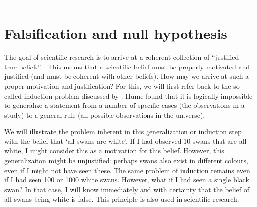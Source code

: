 \documentclass[
]{book}
\begin{document}
\begin{center}\rule{0.5\linewidth}{0.5pt}\end{center}

\hypertarget{sec:falsification}{%
\section{Falsification and null hypothesis}\label{sec:falsification}}

The goal of scientific research is to arrive at a coherent collection of ``justified true beliefs'' \citep{Mort03}. This means that a scientific belief must be properly motivated and justified (and must be coherent with other beliefs). How may we arrive at such a proper motivation and justification? For this, we will first refer back to the so-called induction problem discussed by \citet{Hume1739}. Hume found that it is logically impossible to generalize a statement from a number of specific cases (the observations in a study) to a general rule (all possible observations in the universe).

We will illustrate the problem inherent in this generalization or induction step with the belief that `all swans are white'. If I had observed 10 swans that are all white, I might consider this as a motivation for this belief. However, this generalization might be unjustified: perhaps swans also exist in different colours, even if I might not have seen these. The same problem of induction remains even if I had seen 100 or 1000 white swans. However, what if I had seen a single black swan? In that case, I will know immediately and with certainty that the belief of all swans being white is false. This principle is also used in scientific research.
\end{document}
